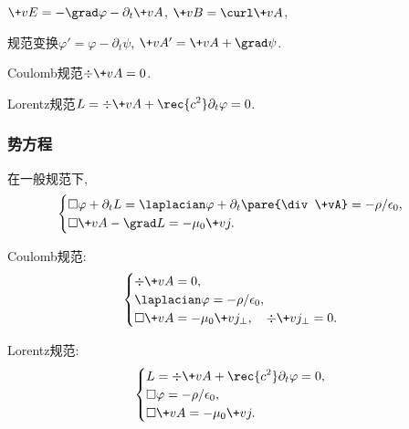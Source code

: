 \documentclass[hidelinks]{ctexart}
\begin{document}
$\+vE = -\grad \varphi - \partial_t \+vA$, $\+vB = \curl \+vA$,
\begin{cenum}
    \item 规范变换$\varphi' = \varphi - \partial_t \psi$, $\+vA' = \+vA + \grad \psi$.
    \item Coulomb规范$\div \+vA = 0$.
    \item Lorentz规范$\displaystyle L = \div \+vA + \rec{c^2}\partial_{t} \varphi = 0$.
\end{cenum}


\subsubsection{势方程} %
\label{ssub:势方程}
在一般规范下,
    \[ \begin{cases}
        \Box{} \varphi + \partial_t L = \laplacian \varphi + \partial_t \pare{\div \+vA} = -\rho/\epsilon_0, \\
        \Box{} \+vA - \grad L = -\mu_0 \+vj.
    \end{cases} \]
\begin{cenum}
    \item Coulomb规范:
    \[ \begin{cases}
        \div \+vA = 0, \\
        \laplacian \varphi = -\rho/\epsilon_0,\\
        \Box{} \+vA = -\mu_0 \+vj_\perp,\quad \div \+vj_\perp = 0.
    \end{cases} \]
    \item Lorentz规范:
    \[ \begin{cases}
        \displaystyle L = \div \+vA + \rec{c^2}\partial_t \varphi = 0, \\
        \Box{}\varphi = -\rho/\epsilon_0, \\
        \Box{}\+vA = -\mu_0 \+vj.
    \end{cases} \]
\end{cenum}
\end{document}
